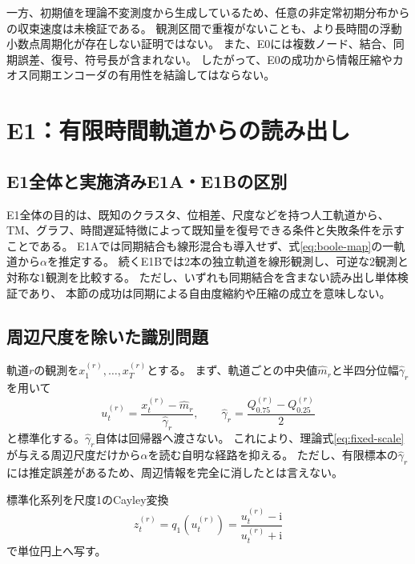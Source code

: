 \documentclass[a4paper,11pt]{jlreq}
\newcommand{\ii}{\mathrm{i}}
\begin{document}
一方、初期値を理論不変測度から生成しているため、任意の非定常初期分布からの収束速度は未検証である。
観測区間で重複がないことも、より長時間の浮動小数点周期化が存在しない証明ではない。
また、E0には複数ノード、結合、同期誤差、復号、符号長が含まれない。
したがって、E0の成功から情報圧縮やカオス同期エンコーダの有用性を結論してはならない。

\section{E1：有限時間軌道からの読み出し}

\subsection{E1全体と実施済みE1A・E1Bの区別}

E1全体の目的は、既知のクラスタ、位相差、尺度などを持つ人工軌道から、
TM、グラフ、時間遅延特徴によって既知量を復号できる条件と失敗条件を示すことである。
E1Aでは同期結合も線形混合も導入せず、式\eqref{eq:boole-map}の一軌道から$\alpha$を推定する。
続くE1Bでは2本の独立軌道を線形観測し、可逆な2観測と対称な1観測を比較する。
ただし、いずれも同期結合を含まない読み出し単体検証であり、
本節の成功は同期による自由度縮約や圧縮の成立を意味しない。

\subsection{周辺尺度を除いた識別問題}

軌道$r$の観測を$x^{(r)}_1,\ldots,x^{(r)}_T$とする。
まず、軌道ごとの中央値$\widehat m_r$と半四分位幅$\widehat\gamma_r$を用いて
\begin{equation}
    u^{(r)}_t
    =\frac{x^{(r)}_t-\widehat m_r}{\widehat\gamma_r},
    \qquad
    \widehat\gamma_r
    =\frac{Q^{(r)}_{0.75}-Q^{(r)}_{0.25}}{2}
    \label{eq:e1-standardization}
\end{equation}
と標準化する。$\widehat\gamma_r$自体は回帰器へ渡さない。
これにより、理論式\eqref{eq:fixed-scale}が与える周辺尺度だけから$\alpha$を読む自明な経路を抑える。
ただし、有限標本の$\widehat\gamma_r$には推定誤差があるため、周辺情報を完全に消したとは言えない。

標準化系列を尺度1のCayley変換
\begin{equation}
    z^{(r)}_t
    =q_1\!\left(u^{(r)}_t\right)
    =\frac{u^{(r)}_t-\ii}{u^{(r)}_t+\ii}
    \label{eq:e1-cayley}
\end{equation}
で単位円上へ写す。
\end{document}
